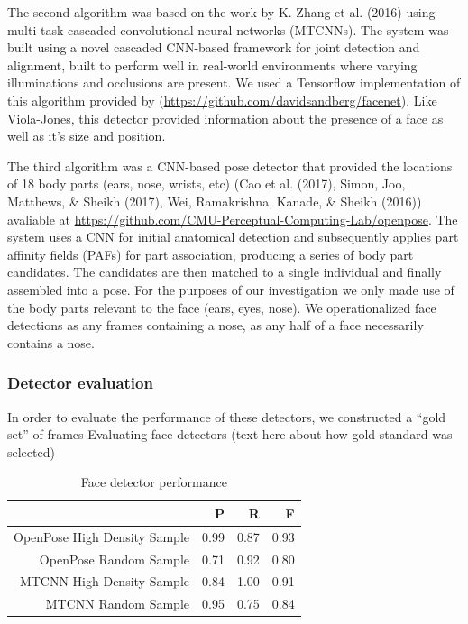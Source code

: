 \documentclass[10pt, letterpaper]{article}
\begin{document}
The second algorithm was based on the work by K. Zhang et al. (2016)
using multi-task cascaded convolutional neural networks (MTCNNs). The
system was built using a novel cascaded CNN-based framework for joint
detection and alignment, built to perform well in real-world
environments where varying illuminations and occlusions are present. We
used a Tensorflow implementation of this algorithm provided by
(\url{https://github.com/davidsandberg/facenet}). Like Viola-Jones, this
detector provided information about the presence of a face as well as
it's size and position.

The third algorithm was a CNN-based pose detector that provided the
locations of 18 body parts (ears, nose, wrists, etc) (Cao et al. (2017),
Simon, Joo, Matthews, \& Sheikh (2017), Wei, Ramakrishna, Kanade, \&
Sheikh (2016)) avaliable at
\url{https://github.com/CMU-Perceptual-Computing-Lab/openpose}. The
system uses a CNN for initial anatomical detection and subsequently
applies part affinity fields (PAFs) for part association, producing a
series of body part candidates. The candidates are then matched to a
single individual and finally assembled into a pose. For the purposes of
our investigation we only made use of the body parts relevant to the
face (ears, eyes, nose). We operationalized face detections as any
frames containing a nose, as any half of a face necessarily contains a
nose.\\

\subsubsection{Detector evaluation}\label{detector-evaluation}

In order to evaluate the performance of these detectors, we constructed
a ``gold set'' of frames Evaluating face detectors (text here about how
gold standard was selected)

\begin{table}[H]
\centering
\begin{tabular}{rrrr}
  \hline
  & P & R & F \\ 
\hline
OpenPose High Density Sample & 0.99 & 0.87 & 0.93 \\ 
OpenPose Random Sample & 0.71 & 0.92 & 0.80 \\
MTCNN High Density Sample & 0.84 & 1.00 & 0.91 \\ 
MTCNN Random Sample & 0.95 & 0.75 & 0.84 \\ 
   \hline
\end{tabular}
\caption{Face detector performance} 
\end{table}
\end{document}
